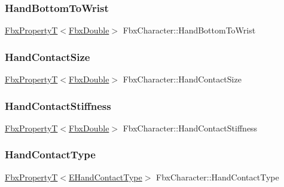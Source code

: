 \subsubsection{\texorpdfstring{Hand\+Bottom\+To\+Wrist}{HandBottomToWrist}}
{\footnotesize\ttfamily \hyperlink{class_fbx_property_t}{Fbx\+PropertyT}$<$\hyperlink{fbxtypes_8h_a171e72a1c46fc15c1a6c9c31948c1c5b}{Fbx\+Double}$>$ Fbx\+Character\+::\+Hand\+Bottom\+To\+Wrist}

\mbox{\label{class_fbx_character_ae54641c1886b9a7fdd7761804a868454}} 
\subsubsection{\texorpdfstring{Hand\+Contact\+Size}{HandContactSize}}
{\footnotesize\ttfamily \hyperlink{class_fbx_property_t}{Fbx\+PropertyT}$<$\hyperlink{fbxtypes_8h_a171e72a1c46fc15c1a6c9c31948c1c5b}{Fbx\+Double}$>$ Fbx\+Character\+::\+Hand\+Contact\+Size}

\mbox{\label{class_fbx_character_a0673e6c72f7ba48be94bf9cac8421fab}} 
\subsubsection{\texorpdfstring{Hand\+Contact\+Stiffness}{HandContactStiffness}}
{\footnotesize\ttfamily \hyperlink{class_fbx_property_t}{Fbx\+PropertyT}$<$\hyperlink{fbxtypes_8h_a171e72a1c46fc15c1a6c9c31948c1c5b}{Fbx\+Double}$>$ Fbx\+Character\+::\+Hand\+Contact\+Stiffness}

\mbox{\label{class_fbx_character_af0af2decb9d4fcc0cfbe59c077719343}} 
\subsubsection{\texorpdfstring{Hand\+Contact\+Type}{HandContactType}}
{\footnotesize\ttfamily \hyperlink{class_fbx_property_t}{Fbx\+PropertyT}$<$\hyperlink{class_fbx_character_a37c46ee42910cc3209e925bc4c7361f4}{E\+Hand\+Contact\+Type}$>$ Fbx\+Character\+::\+Hand\+Contact\+Type}

